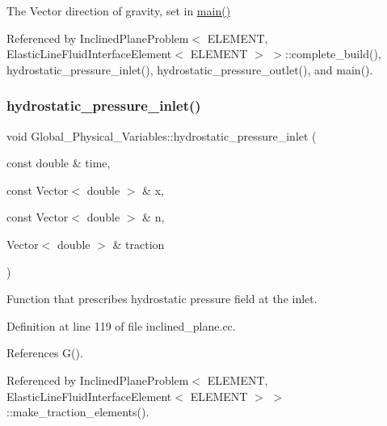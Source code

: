 The Vector direction of gravity, set in \hyperlink{inclined__plane_8cc_a3c04138a5bfe5d72780bb7e82a18e627}{main()} 



Referenced by Inclined\+Plane\+Problem$<$ E\+L\+E\+M\+E\+N\+T, Elastic\+Line\+Fluid\+Interface\+Element$<$ E\+L\+E\+M\+E\+N\+T $>$ $>$\+::complete\+\_\+build(), hydrostatic\+\_\+pressure\+\_\+inlet(), hydrostatic\+\_\+pressure\+\_\+outlet(), and main().

\mbox{\label{namespaceGlobal__Physical__Variables_af1f48eb04a3c7f97b1efacea533acdbc}} 
\subsubsection{\texorpdfstring{hydrostatic\+\_\+pressure\+\_\+inlet()}{hydrostatic\_pressure\_inlet()}}
{\footnotesize\ttfamily void Global\+\_\+\+Physical\+\_\+\+Variables\+::hydrostatic\+\_\+pressure\+\_\+inlet (\begin{DoxyParamCaption}\item[{const double \&}]{time,  }\item[{const Vector$<$ double $>$ \&}]{x,  }\item[{const Vector$<$ double $>$ \&}]{n,  }\item[{Vector$<$ double $>$ \&}]{traction }\end{DoxyParamCaption})}



Function that prescribes hydrostatic pressure field at the inlet. 



Definition at line 119 of file inclined\+\_\+plane.\+cc.



References G().



Referenced by Inclined\+Plane\+Problem$<$ E\+L\+E\+M\+E\+N\+T, Elastic\+Line\+Fluid\+Interface\+Element$<$ E\+L\+E\+M\+E\+N\+T $>$ $>$\+::make\+\_\+traction\+\_\+elements().

\mbox{\label{namespaceGlobal__Physical__Variables_ab577639e7c51979d3db7565c08c69c70}} 
